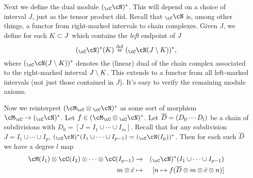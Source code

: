 Next we define the dual module $(_\cC\cN)^*$.
This will depend on a choice of interval $J$, just as the tensor product did.
Recall that $_\cC\cN$ is, among other things, a functor from right-marked intervals
to chain complexes.
Given $J$, we define for each $K\subset J$ which contains the {\it left} endpoint of $J$
\[
	(_\cC\cN)^*(K) \deq ({_\cC\cN}(J\setmin K))^* ,
\]
where $({_\cC\cN}(J\setmin K))^*$ denotes the (linear) dual of the chain complex associated
to the right-marked interval $J\setminus K$.
This extends to a functor from all left-marked intervals (not just those contained in $J$).
It's easy to verify the remaining module axioms.

Now we reinterpret $(\cM_\cC\ot {_\cC\cN})^*$
as some sort of morphism $\cM_\cC \to (_\cC\cN)^*$.
Let $f\in (\cM_\cC\ot {_\cC\cN})^*$.
Let ${\overline D} = (D_0\cdots D_l)$ be a chain of subdivisions with $D_0 = [J = I_1\cup\cdots\cup I_m]$.
Recall that for any subdivision $J = I_1\cup\cdots\cup I_p$, $(_\cC\cN)^*(I_1\cup\cdots\cup I_{p-1}) = (_\cC\cN(I_p))^*$.
Then for each such ${\overline D}$ we have a degree $l$ map
\begin{eqnarray*}
	\cM(I_1)\ot\cC(I_2)\ot\cdots\ot\cC(I_{p-1}) &\to& (_\cC\cN)^*(I_1\cup\cdots\cup I_{p-1}) \\
	m\ot \cbar &\mapsto& [n\mapsto f(\olD\ot m\ot \cbar\ot n)]
\end{eqnarray*}

